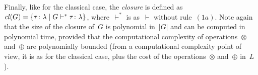 \ifnormalisedardf%
\else%
%
Finally, like for the classical case, the \emph{closure} is defined as~$\mathit{cl}\!\left(G\right) = \{\mbox{$\tau\colon\lambda$} \mid G
\vdash^{*} \mbox{$\tau\colon\lambda$} \}$, where~$\vdash^{*}$ is as~$\vdash$ without rule~$(1a)$.  Note again that the size
of the closure of~$G$ is polynomial in~$|G|$ and can be computed in polynomial time, provided that the computational
complexity of operations~$\otimes$ and~$\oplus$ are polynomially bounded (from a computational complexity point of view,
it is as for the classical case, plus the cost of the operations~$\otimes$ and~$\oplus$ in~$L$).
%
\fi




